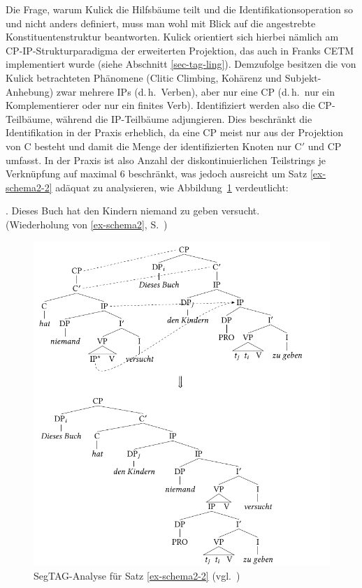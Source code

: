 Die Frage, warum Kulick die Hilfsbäume teilt und die Identifikationsoperation so und nicht anders definiert, muss man wohl mit Blick auf die angestrebte Konstituentenstruktur beantworten. Kulick orientiert sich hierbei nämlich am CP-IP-Strukturparadigma der erweiterten Projektion, das auch in Franks CETM implementiert wurde (siehe Abschnitt \ref{sec-tag-ling}). Demzufolge besitzen die von Kulick betrachteten Phänomene (Clitic Climbing, Kohärenz und Subjekt-Anhebung) zwar mehrere IPs (d.\,h.\ Verben), aber nur eine CP (d.\,h.\ nur ein Komplementierer oder nur ein finites Verb). Identifiziert werden also die CP-Teilbäume, während die IP-Teilbäume adjungieren. Dies beschränkt die Identifikation in der Praxis erheblich, da eine CP meist nur aus der Projektion von C besteht und damit die Menge der identifizierten Knoten nur C$'$ und CP umfasst. In der Praxis ist also Anzahl der diskontinuierlichen Teilstrings je Verknüpfung auf maximal 6 beschränkt, was jedoch ausreicht um Satz \ref{ex-schema2-2} adäquat zu analysieren, wie Abbildung~\ref{fig-seg-ling1} verdeutlicht:

\ex. {Dieses Buch} hat {den Kindern} niemand {zu geben} versucht.\label{ex-schema2-2} \\ 
(Wiederholung von \ref{ex-schema2}, S.~\pageref{ex-schema2}) 

\begin{figure}[p] 
\centering
\includegraphics{graphics/abb613.pdf}
\caption{SegTAG-Analyse für Satz \ref{ex-schema2-2} (vgl.\ \citealt[(130) ,(131)]{Kulick:00})\label{fig-seg-ling1}}
\end{figure}

